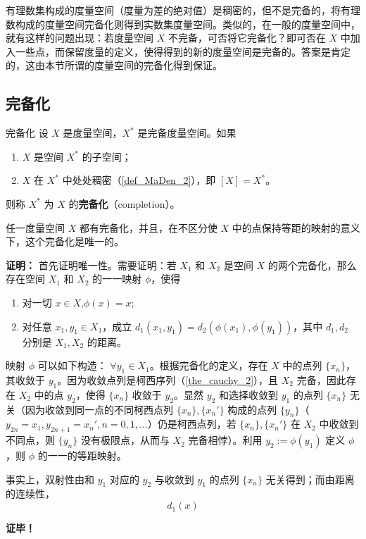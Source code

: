 
有理数集构成的度量空间（度量为差的绝对值）是稠密的，但不是完备的，将有理数构成的度量空间完备化则得到实数集度量空间。类似的，在一般的度量空间中，就有这样的问题出现：若度量空间 $X$ 不完备，可否将它完备化？即可否在 $X$ 中加入一些点，而保留度量的定义，使得得到的新的度量空间是完备的。答案是肯定的，这由本节所谓的度量空间的完备化得到保证。

\subsection{完备化}
\begin{definition}{完备化}
设 $X$ 是度量空间，$X^*$ 是完备度量空间。如果
\begin{enumerate}
\item $X$ 是空间 $X^*$ 的子空间；
\item $X$ 在 $X^*$ 中处处稠密（\autoref{def_MaDen_2}），即 $[X]=X^*$。
\end{enumerate}
则称 $X^*$ 为 $X$ 的\textbf{完备化}（completion）。
\end{definition}

\begin{theorem}{}
任一度量空间 $X$ 都有完备化，并且，在不区分使 $X$ 中的点保持等距的映射的意义下，这个完备化是唯一的。
\end{theorem}

\textbf{证明：}
首先证明唯一性。需要证明：若 $X_1$ 和 $X_2$ 是空间 $X$ 的两个完备化，那么存在空间 $X_1$ 和 $X_2$ 的一一映射 $\phi$，使得
\begin{enumerate}
\item 对一切 $x\in X$,$\phi(x)=x$;
\item 对任意 $x_1,y_1\in X_1$，成立 $d_1(x_1,y_1)=d_2(\phi(x_1),\phi(y_1))$，其中 $d_1,d_2$ 分别是 $X_1,X_2$ 的距离。
\end{enumerate}
映射 $\phi$ 可以如下构造： $\forall y_1\in X_1$。根据完备化的定义，存在 $X$ 中的点列 $\{x_n\}$，其收敛于 $y_1$。因为收敛点列是柯西序列（\autoref{the_cauchy_2}），且 $X_2$ 完备，因此存在 $X_2$ 中的点 $y_2$，使得 $\{x_n\}$ 收敛于 $y_2$。显然 $y_2$ 和选择收敛到 $y_1$ 的点列 $\{x_n\}$ 无关（因为收敛到同一点的不同柯西点列 $\{x_n\},\{x_n'\}$ 构成的点列 $\{y_n\}$（$y_{2n}=x_1,y_{2n+1}=x_n',n=0,1,\ldots$）仍是柯西点列，若 $\{x_n\},\{x_n'\}$ 在 $X_2$ 中收敛到不同点，则 $\{y_n\}$ 没有极限点，从而与 $X_2$ 完备相悖）。利用 $y_2:=\phi(y_1)$ 定义 $\phi$，则 $\phi$ 的一一的等距映射。

事实上，双射性由和 $y_1$ 对应的 $y_2$ 与收敛到 $y_1$ 的点列 $\{x_n\}$ 无关得到；而由距离的连续性，
\begin{equation}
d_1(x)
\end{equation}


\textbf{证毕！}

